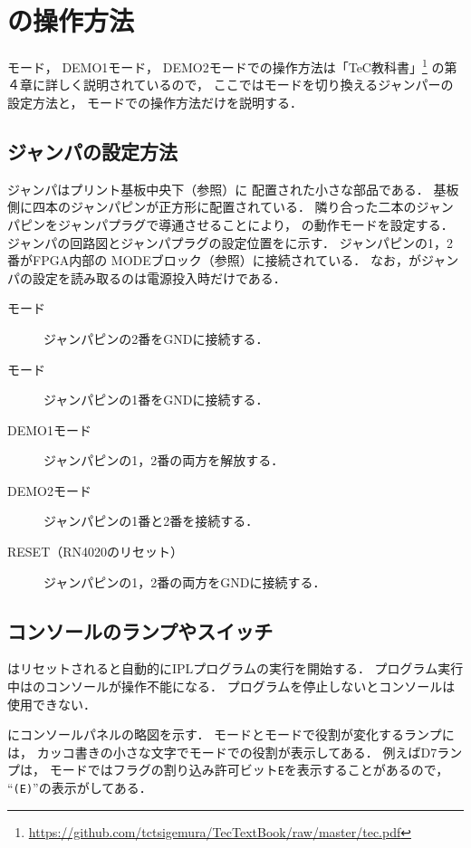 \chapter{{\tecS}の操作方法}

{\tec}モード，
DEMO1モード，
DEMO2モードでの操作方法は「TeC教科書」\footnote{
\url{https://github.com/tctsigemura/TecTextBook/raw/master/tec.pdf}}
の第４章に詳しく説明されているので，
ここではモードを切り換えるジャンパーの設定方法と，
{\tac}モードでの操作方法だけを説明する．

\section{ジャンパの設定方法}
ジャンパはプリント基板中央下（参照）に
配置された小さな部品である．
基板側に四本のジャンパピンが正方形に配置されている．
隣り合った二本のジャンパピンをジャンパプラグで導通させることにより，
{\tecS}の動作モードを設定する．
ジャンパの回路図とジャンパプラグの設定位置をに示す．
ジャンパピンの1，2番がFPGA内部の
MODEブロック（参照）に接続されている．
なお，{\tecS}がジャンパの設定を読み取るのは電源投入時だけである．

\begin{description}
  \item[{\tec}モード] ジャンパピンの2番をGNDに接続する．
  \item[{\tac}モード] ジャンパピンの1番をGNDに接続する．
  \item[DEMO1モード] ジャンパピンの1，2番の両方を解放する．
  \item[DEMO2モード] ジャンパピンの1番と2番を接続する．
  \item[RESET（RN4020のリセット）] ジャンパピンの1，2番の両方をGNDに接続する．
\end{description}


\section{コンソールのランプやスイッチ}
{\tac}はリセットされると自動的にIPLプログラムの実行を開始する．
プログラム実行中は{\tac}のコンソールが操作不能になる．
プログラムを停止しないとコンソールは使用できない．

にコンソールパネルの略図を示す．
{\tec}モードと{\tac}モードで役割が変化するランプには，
カッコ書きの小さな文字で{\tac}モードでの役割が表示してある．
例えばD7ランプは，
{\tac}モードではフラグの割り込み許可ビット\texttt{E}を表示することがあるので，
``\texttt{(E)}''の表示がしてある．

